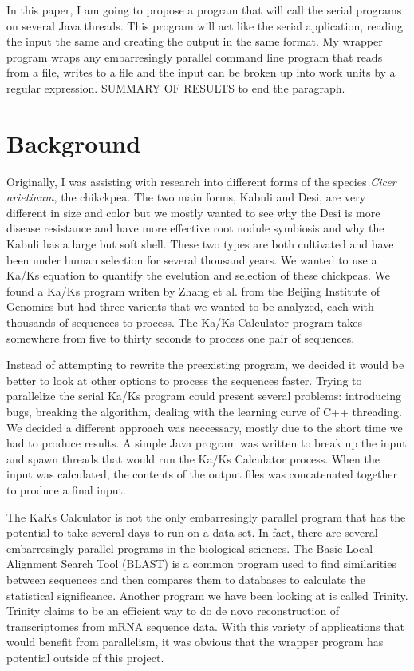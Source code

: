 \documentclass[12pt]{article}
\begin{document}
In this paper, I am going to propose a program that will call the serial
programs on several Java threads. This program will act like the serial
application, reading the input the same and creating the output in the same
format. My wrapper program wraps any embarresingly parallel command line program
that reads from a file, writes to a file and the input can be broken up into
work units by a regular expression. SUMMARY OF RESULTS to end the paragraph.

\section{Background}

Originally, I was assisting with research into different forms of the species 
\emph{Cicer arietinum}, the chikckpea. The two main forms, Kabuli and Desi, are
very different in size and color but we mostly wanted to see why the Desi is
more disease resistance and have more effective root nodule symbiosis and why
the Kabuli has a large but soft shell. These two types are both cultivated and
have been under human selection for several thousand years. We wanted to use a
Ka/Ks equation to quantify the evelution and selection of these chickpeas. We
found a Ka/Ks program writen by Zhang et al. from the Beijing Institute of 
Genomics \cite{kaks} but had three varients that we wanted to be analyzed, each 
with thousands of sequences to process. The Ka/Ks Calculator program takes
somewhere from five to thirty seconds to process one pair of sequences. 

Instead of attempting to rewrite the preexisting program, we decided it would be
better to look at other options to process the sequences faster. Trying to 
parallelize the serial Ka/Ks program could present several problems: introducing
bugs, breaking the algorithm, dealing with the learning curve of C++ threading. 
We decided a  different approach was neccessary, mostly due to the short time we
had to produce results. A simple Java program was written to break up the input 
and spawn  threads that would run the Ka/Ks Calculator process. When the input 
was calculated, the contents of the output files was concatenated together to 
produce a final input. 

The KaKs Calculator is not the only embarresingly parallel program that has the
potential to take several days to run on a data set. In fact, there are several
embarresingly parallel programs in the biological sciences. The Basic Local
Alignment Search Tool (BLAST) \cite{BLAST} is a common program used to find
similarities between sequences and then compares them to databases to calculate
the statistical significance. Another program we have been looking at is called
Trinity. Trinity claims to be an efficient way to do de novo reconstruction of
transcriptomes from mRNA sequence data. With this variety of applications that 
would benefit from parallelism, it was obvious that the wrapper program has 
potential outside of this project.
\end{document}
